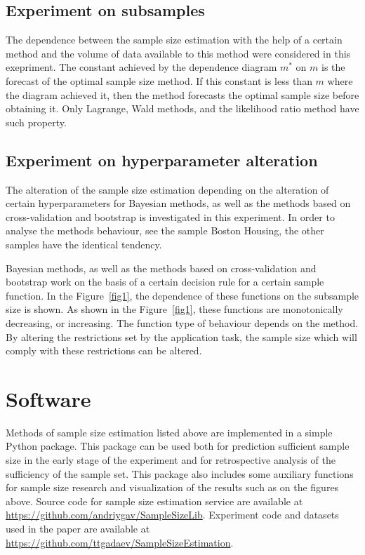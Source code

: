 \documentclass[
11pt,%
tightenlines,%
twoside,%
onecolumn,%
nofloats,%
nobibnotes,%
nofootinbib,%
superscriptaddress,%
noshowpacs,%
centertags]%
{revtex4}
\begin{document}
\subsection{Experiment on subsamples}
The dependence between the sample size estimation with the help of a certain method and the volume of data available to this method were considered in this exepriment. The constant achieved by the dependence diagram $m^*$ on $m$ is the forecast of the optimal sample size method. If this constant is less than $m$ where the diagram achieved it, then the method forecasts the optimal sample size before obtaining it. Only Lagrange, Wald methods, and the likelihood ratio method have such property.

\subsection{Experiment on hyperparameter alteration} 
The alteration of the sample size estimation depending on the alteration of certain hyperparameters for Bayesian methods, as well as the methods based on cross-validation and bootstrap is investigated in this experiment. In order to analyse the methods behaviour, see the sample {Boston Housing}, the other samples have the identical tendency.

Bayesian methods, as well as the methods based on cross-validation and bootstrap work on the basis of a certain decision rule for a certain sample function. In the Figure~\ref{fig1}, the dependence of these functions on the subsample size is shown. As shown in the Figure~\ref{fig1}, these functions are monotonically decreasing, or increasing. The function type of behaviour depends on the method. By altering the restrictions set by the application task, the sample size which will comply with these restrictions can be altered.

\section{Software}
Methods of sample size estimation listed above are implemented in a simple Python package. This package can be used both for prediction sufficient sample size in the early stage of the experiment and for retrospective analysis of the sufficiency of the sample set. This package also includes some auxiliary functions for sample size research and visualization of the results such as on the figures above. Source code for sample size estimation service are available at \mbox{\url{https://github.com/andriygav/SampleSizeLib}}. Experiment code and datasets used in the paper are available at \mbox{\url{https://github.com/ttgadaev/SampleSizeEstimation}}.
\end{document}
